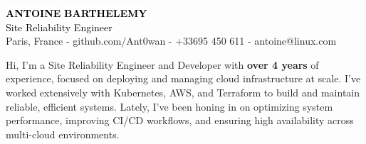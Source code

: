 \documentclass[10pt]{developercv}
\begin{document}
\hspace{-7pt}
	\vspace{-\baselineskip}
	\vspace{7pt}
	\colorbox{white}{{\HUGE\textcolor{black}{\textbf{\MakeUppercase{Antoine}}}}}
	\colorbox{white}{{\HUGE\textcolor{black}{\textbf{\MakeUppercase{Barthelemy}}}}}\\
	\colorbox{white}{\textcolor{black}{\huge{Site Reliability Engineer}}}\\
	\vspace{6pt}
	\vspace{-\baselineskip}
	\vspace{9pt}
	{Paris, France - github.com/Ant0wan - +33695 450 611 - antoine@linux.com}

\vspace{-10pt}


\hspace{0pt}\begin{minipage}[t]{1.00\textwidth}
	\vspace{-\baselineskip}
	{Hi, I’m a Site Reliability Engineer and Developer with \textbf{over 4 years} of experience, focused on deploying and managing cloud infrastructure at scale. I’ve worked extensively with Kubernetes, AWS, and Terraform to build and maintain reliable, efficient systems. Lately, I’ve been honing in on optimizing system performance, improving CI/CD workflows, and ensuring high availability across multi-cloud environments.}
\end{minipage}
\hfill

\end{document}
